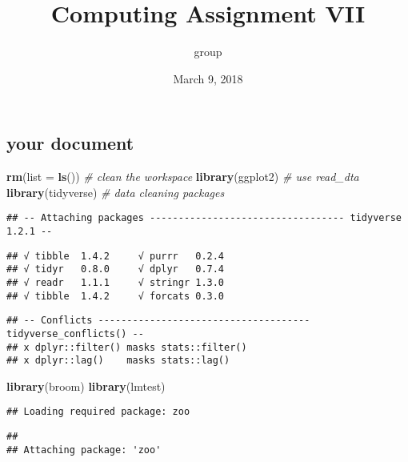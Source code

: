 \documentclass[]{article}
\title{Computing Assignment VII}
\author{group}
\date{March 9, 2018}
\newenvironment{Shaded}{\begin{snugshade}}{\end{snugshade}}
\newcommand{\KeywordTok}[1]{\textcolor[rgb]{0.13,0.29,0.53}{\textbf{{#1}}}}
\newcommand{\DataTypeTok}[1]{\textcolor[rgb]{0.13,0.29,0.53}{{#1}}}
\newcommand{\CommentTok}[1]{\textcolor[rgb]{0.56,0.35,0.01}{\textit{{#1}}}}
\newcommand{\NormalTok}[1]{{#1}}
\begin{document}
\maketitle

\subsection{your document}\label{your-document}

\begin{Shaded}
\begin{Highlighting}[]
\KeywordTok{rm}\NormalTok{(}\DataTypeTok{list =} \KeywordTok{ls}\NormalTok{())           }\CommentTok{# clean the workspace}
\KeywordTok{library}\NormalTok{(ggplot2)          }\CommentTok{# use read_dta}
\KeywordTok{library}\NormalTok{(tidyverse)        }\CommentTok{# data cleaning packages}
\end{Highlighting}
\end{Shaded}

\begin{verbatim}
## -- Attaching packages ---------------------------------- tidyverse 1.2.1 --
\end{verbatim}

\begin{verbatim}
## √ tibble  1.4.2     √ purrr   0.2.4
## √ tidyr   0.8.0     √ dplyr   0.7.4
## √ readr   1.1.1     √ stringr 1.3.0
## √ tibble  1.4.2     √ forcats 0.3.0
\end{verbatim}

\begin{verbatim}
## -- Conflicts ------------------------------------- tidyverse_conflicts() --
## x dplyr::filter() masks stats::filter()
## x dplyr::lag()    masks stats::lag()
\end{verbatim}

\begin{Shaded}
\begin{Highlighting}[]
\KeywordTok{library}\NormalTok{(broom)}
\KeywordTok{library}\NormalTok{(lmtest)}
\end{Highlighting}
\end{Shaded}

\begin{verbatim}
## Loading required package: zoo
\end{verbatim}

\begin{verbatim}
## 
## Attaching package: 'zoo'
\end{verbatim}
\end{document}
